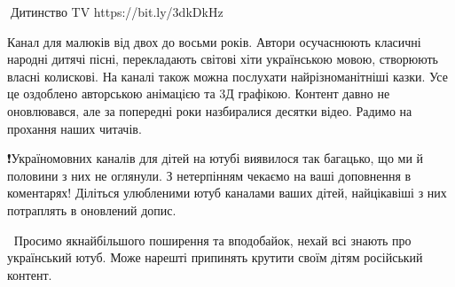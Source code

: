 🦉Дитинство TV https://bit.ly/3dkDkHz

Канал для малюків від двох до восьми років. Автори осучаснюють класичні народні дитячі пісні, перекладають світові хіти українською мовою, створюють власні колискові. На каналі також можна послухати найрізноманітніші казки. Усе це оздоблено авторською анімацією та 3Д графікою. Контент давно не оновлювався, але за попередні роки назбиралися десятки відео. Радимо на прохання наших читачів.

❗️Україномовних каналів для дітей на ютубі виявилося так багацько, що ми й половини з них не оглянули. З нетерпінням чекаємо на ваші доповнення в коментарях! Діліться улюбленими ютуб каналами ваших дітей, найцікавіші з них потраплять в оновлений допис.

💛💙Просимо якнайбільшого поширення та вподобайок, нехай всі знають про український ютуб. Може нарешті припинять крутити своїм дітям російський контент.
